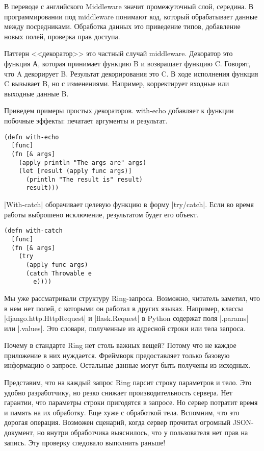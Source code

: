 В переводе с английского Middleware значит промежуточный слой, середина. В
программировании под middleware понимают код, который обрабатывает данные между
посредниками. Обработка данных это приведение типов, добавление новых полей,
проверка прав доступа.

Паттерн <<декоратор>> это частный случай middleware. Декоратор это функция А,
которая принимает функцию B и возвращает функцию C. Говорят, что A декорирует
B. Результат декорирования это C. В ходе исполнения функция C вызывает B, но с
изменениями. Например, корректирует входные или выходные данные B.

Приведем примеры простых декораторов. with-echo добавляет к функции побочные
эффекты: печатает аргументы и результат.

\begin{verbatim}
(defn with-echo
  [func]
  (fn [& args]
    (apply println "The args are" args)
    (let [result (apply func args)]
      (println "The result is" result)
      result)))
\end{verbatim}

\spverb|With-catch| оборачивает целевую функцию в форму \spverb|try/catch|. Если во время
работы выброшено исключение, результатом будет его объект.

\begin{verbatim}
(defn with-catch
  [func]
  (fn [& args]
    (try
      (apply func args)
      (catch Throwable e
        e))))
\end{verbatim}

Мы уже рассматривали структуру Ring-запроса. Возможно, читатель заметил, что в
нем нет полей, с которыми он работал в других языках. Например, классы
\spverb|django.http.HttpRequest| и \spverb|flask.Request| в Python содержат поля \spverb|.params| или
\spverb|.values|. Это словари, полученные из адресной строки или тела запроса.

Почему в стандарте Ring нет столь важных вещей? Потому что не каждое приложение
в них нуждается. Фреймворк предоставляет только базовую информацию о
запросе. Остальные данные могут быть получены из исходных.

Представим, что на каждый запрос Ring парсит строку параметров и тело. Это
удобно разработчику, но резко снижает производительность сервера. Нет гарантии,
что параметры строки пригодятся в запросе. Но сервер потратит время и память на
их обработку. Еще хуже с обработкой тела. Вспомним, что это дорогая
операция. Возможен сценарий, когда сервер прочитал огромный JSON-документ, но
внутри обработчика выяснилось, что у пользователя нет прав на запись. Эту
проверку следовало выполнить раньше!

